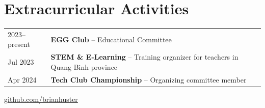 \documentclass[a4paper,10pt]{article}
\begin{document}
\vspace{4mm}

\section{Extracurricular Activities}
\begin{tabular}{p{2.5cm}p{13cm}}
2023--present & \textbf{EGG Club} -- Educational Committee\\
Jul 2023 & \textbf{STEM \& E-Learning} -- Training organizer for teachers in Quang Binh province\\
Apr 2024 & \textbf{Tech Club Championship} -- Organizing committee member\\
\end{tabular}

\vfill
\hfill \url{github.com/brianhuster}
\end{document}
